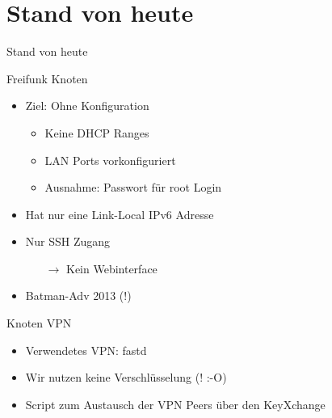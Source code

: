 \section{Stand von heute}
\begin{frame}{}
    \begin{center}
        Stand von heute
     \end{center}
\end{frame}

\begin{frame}{Freifunk Knoten}
    \begin{itemize}
        \item Ziel: Ohne Konfiguration
        \begin{itemize}
            \item Keine DHCP Ranges
            \item LAN Ports vorkonfiguriert
            \item Ausnahme: Passwort für root Login
        \end{itemize}
        \item Hat nur eine Link-Local IPv6 Adresse
        \item Nur SSH Zugang
        \begin{itemize}
            \item[$\rightarrow$] Kein Webinterface
        \end{itemize}
        \item Batman-Adv 2013 (!)
    \end{itemize}
\end{frame}

\begin{frame}{Knoten VPN}
    \begin{itemize}
        \item Verwendetes VPN: fastd
        \item Wir nutzen keine Verschlüsselung (! :-O)
        \item Script zum Austausch der VPN Peers über den KeyXchange
    \end{itemize}
\end{frame}

